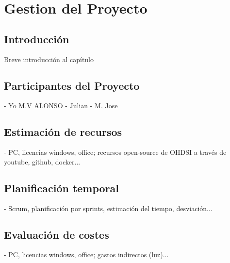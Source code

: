 \chapter{Gestion del Proyecto}\label{cap:gestión}

\section{Introducción}
Breve introducción al capítulo

\section{Participantes del Proyecto}

- Yo M.V ALONSO
- Julian
- M. Jose 



\section{Estimación de recursos}

- PC, licencias windows, office; recursos open-source de OHDSI a través de youtube, github, docker...

\section{Planificación temporal}

- Scrum, planificación por sprints, estimación del tiempo, desviación...

\section{Evaluación de costes}

- PC, licencias windows, office; gastos indirectos (luz)...

